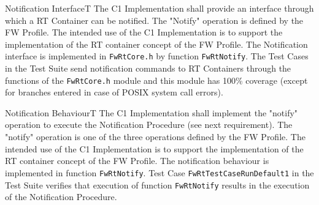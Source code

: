 \documentclass[a4paper,10pt]{article}
\newenvironment{fw_req}[6]
{\addtocounter{subsubsection}{1}
	\hspace{0.2cm}\textbf{FW-\arabic{section}.\arabic{subsection}.\arabic{subsubsection}/#2
	\hspace{0.8cm} #1}
	\vspace{-10pt}
\begin{longtable}{p{2.7cm}P{8.5cm}}
\hline
\textsc{Requirement} & #3 \\
\textsc{Justification} & #4 \\
\textsc{Implementation} & #5  \\ 
\textsc{Verification} & #6  \\
\hline
}
{\end{longtable}}
\begin{document}
\begin{fw_req}{Notification Interface}{T}
{The C1 Implementation shall provide an interface through which a RT Container 
can be notified.}
{The "Notify" operation is defined by the FW Profile. The intended use of the C1 Implementation is to support the implementation of the RT container concept of the FW Profile.}
{The Notification interface is implemented in \texttt{FwRtCore.h} by 
function \texttt{FwRtNotify}.} 
{The Test Cases in the Test Suite send notification commands to RT Containers 
through the functions of the \texttt{FwRtCore.h} module and this module has 100\% coverage (except for branches entered in case of POSIX system call errors).}
\end{fw_req}

\newpage 

\begin{fw_req}{Notification Behaviour}{T}
{The C1 Implementation shall implement the "notify" operation to execute the Notification Procedure (see next requirement).}
{The "notify" operation is one of the three operations defined by the FW Profile. The intended use of the C1 Implementation is to support the implementation of the RT container concept of the FW Profile.}
{The notification behaviour is implemented in function \texttt{FwRtNotify}.} 
{Test Case \texttt{FwRtTestCaseRunDefault1} in the Test Suite verifies that execution of function \texttt{FwRtNotify} results in the execution of the Notification Procedure.}
\end{fw_req}
\end{document}
